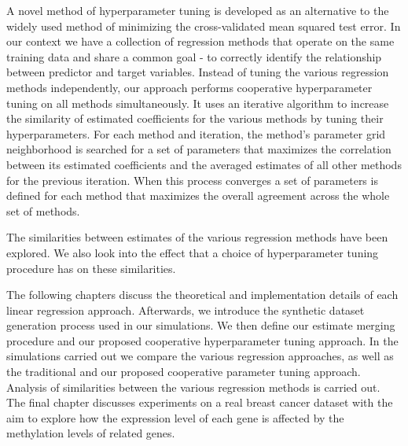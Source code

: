 A novel method of hyperparameter tuning is developed as an alternative to the widely used method of minimizing the cross-validated mean squared test error. In our context we have a collection of regression methods that operate on the same training data and share a common goal - to correctly identify the relationship between predictor and target variables. Instead of tuning the various regression methods independently, our approach performs cooperative hyperparameter tuning on all methods simultaneously. It uses an iterative algorithm to increase the similarity of estimated coefficients for the various methods by tuning their hyperparameters. For each method and iteration, the method's parameter grid neighborhood is searched for a set of parameters that maximizes the correlation between its estimated coefficients and the averaged estimates of all other methods for the previous iteration. When this process converges a set of parameters is defined for each method that maximizes the overall agreement across the whole set of methods.

The similarities between estimates of the various regression methods have been explored. We also look into the effect that a choice of hyperparameter tuning procedure has on these similarities.

The following chapters discuss the theoretical and implementation details of each linear regression approach. Afterwards, we introduce the synthetic dataset generation process used in our simulations. We then define our estimate merging procedure and our proposed cooperative hyperparameter tuning approach. In the simulations carried out we compare the various regression approaches, as well as the traditional and our proposed cooperative parameter tuning approach. Analysis of similarities between the various regression methods is carried out. The final chapter discusses experiments on a real breast cancer dataset with the aim to explore how the expression level of each gene is affected by the methylation levels of related genes.
